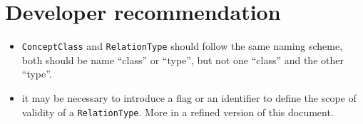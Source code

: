 \documentclass[a4paper,10pt]{article}
\newcommand{\term}[1]{\texttt{#1}\xspace}
\newcommand{\rt}{\term{RelationType}}
\begin{document}
\section{Developer recommendation}

\begin{itemize}
\item \term{ConceptClass} and \term{RelationType} should follow the same naming scheme, both should be name ``class'' or ``type'', but not one ``class'' and the other ``type''.

\item it may be necessary to introduce a flag or an identifier to define the scope of validity of a \rt. More in a refined version of this document.
\end{itemize}
\end{document}
